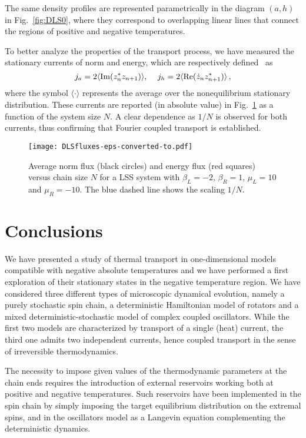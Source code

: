 \documentclass[iop, twocolumns, amssymb,notitlepage]{revtex4-1}
\newcommand{\indice}{n}
\begin{document}
The same density profiles  are represented parametrically in the diagram $(a,h)$ in Fig.~\ref{fig:DLS0}, where
they correspond to overlapping linear lines that connect the regions of positive and negative temperatures.


To better analyze the properties of the transport process, we have measured the stationary currents of norm and
energy, which are respectively defined~\cite{iubini12,iubini19} as
\begin{equation}
j_a=2\langle {\rm Im}(z_\indice^* z_{\indice+1})\rangle, \quad \,j_h=2\langle {\rm Re}(\dot z_\indice z_{\indice+1}^*)\rangle\,,
\end{equation}
where the symbol $\langle \cdot \rangle$ represents the average over the nonequilibrium stationary distribution.
These currents are reported (in absolute value) in Fig.~\ref{fig:DLS2} as a function of the system size $N$. A clear dependence as
$1/N$ is observed for both currents, thus confirming that Fourier coupled transport is established. 


\begin{figure}
 \centering
\texttt{[image: DLSfluxes-eps-converted-to.pdf]}
\caption{\label{fig:DLS2} 
Average norm flux (black circles) and energy flux (red squares) versus chain size $N$  for a  LSS system with $\beta_L=-2$, $\beta_R=1$, $\mu_L=10$ and $\mu_R=-10$.
The blue dashed line shows the scaling  $1/N$.}
 \end{figure}



\section{Conclusions}
\label{sec:concl}

We have presented a study of  thermal transport in one-dimensional models  compatible with negative absolute temperatures and we have performed a first exploration of their stationary states in the negative temperature region.
We have considered three different types of microscopic dynamical evolution, namely a purely stochastic spin chain, a 
deterministic Hamiltonian model of rotators and a mixed deterministic-stochastic model of complex coupled oscillators. While
the first two models are characterized by transport of a single (heat) current, the third one admits two independent currents, hence coupled transport in the sense of irreversible thermodynamics. 
 
The necessity to impose given values of the thermodynamic parameters at the chain ends requires the introduction
of external reservoirs working both at positive and negative temperatures.  Such reservoirs have been implemented 
in the spin chain by simply imposing the target equilibrium distribution on the extremal spins,
and in the oscillators model as a Langevin equation complementing the deterministic dynamics. 
\end{document}
